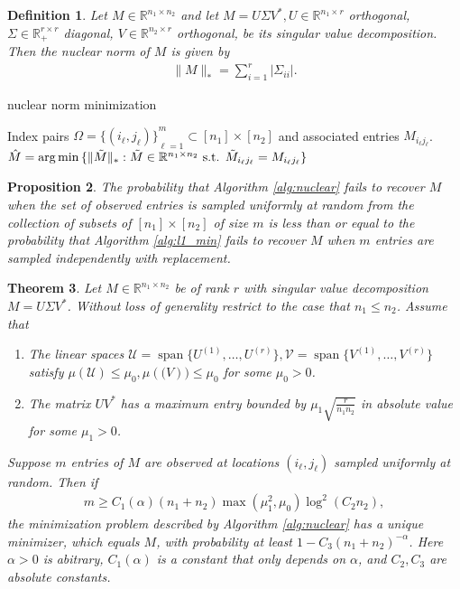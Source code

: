 \documentclass[13pt]{article}
\newtheorem{thm}{Theorem}[section]
\newtheorem{prop}[thm]{Proposition}
\theoremstyle{plain}
\newtheorem{defi}[thm]{Definition}
\newcommand{\R}{\mathbb{R}}
\newcommand{\set}[1]{{\{#1\}}}
\DeclareMathOperator{\argmin}{\arg\min}
\DeclareMathOperator{\mspan}{span}
\newcommand{\til}{\ensuremath{\tilde}}
\begin{document}
\begin{defi}
    Let $M \in \R^{n_1 \times n_2}$ and let $M = U \Sigma V^\ast, U \in \R^{n_1 \times r}$ orthogonal,
    $\Sigma \in \R_+^{r \times r}$ diagonal, $V \in \R^{n_2 \times r}$ orthogonal, be its
    singular value decomposition. Then the \emph{nuclear norm} of $M$ is given by
    \[
        \begin{aligned}
            \|M\|_\ast = \sum_{i=1}^{r} |\Sigma_{ii}|.
        \end{aligned}
    \]
\end{defi}

\begin{algorithm}
\caption{nuclear norm minimization}\label{alg:nuclear}
\begin{algorithmic}
    \Require Index pairs $\Omega = \set{(i_\ell,j_\ell)}_{\ell=1}^m \subset [n_1] \times [n_2]$
        and associated entries $M_{i_\ell j_{\ell}}$.
    \State \Return $\hat{M} = \argmin\set{\|\til{M}\|_\ast : \til{M} \in \R^{n_1 \times n_2} \text{ s.t. } \til{M}_{i_\ell j_\ell} = M_{i_\ell j_\ell}}$
\end{algorithmic}
\end{algorithm}

\begin{prop}
    The probability that Algorithm \ref{alg:nuclear} fails to recover $M$ when
    the set of observed entries is sampled uniformly at random
    from the collection of subsets of $[n_1] \times [n_2]$ of size $m$
    is less than or equal to the probability that Algorithm \ref{alg:l1_min}
    fails to recover $M$ when $m$ entries are sampled independently with replacement.
\end{prop}

\begin{thm}\label{thm:uniq-minimizer}
    Let $M \in \R^{n_1 \times n_2}$ be of rank $r$ with singular value decomposition
    $M = U\Sigma V^\ast$. Without loss of generality restrict to the case that
    $n_1 \le n_2$. Assume that
    \begin{enumerate}[label=(A\arabic*), start=0]
        \item The linear spaces $\mathcal{U} = \mspan\set{U^{(1)}, \ldots, U^{(r)}}, \mathcal{V} = \mspan\set{V^{(1)}, \ldots, V^{(r)}}$
            satisfy $\mu(\mathcal{U}) \le \mu_0, \mu(\mathcal(V)) \le \mu_0$ for some $\mu_0 > 0$.
        \item The matrix $UV^\ast$ has a maximum entry bounded by $\mu_1\sqrt{\frac{r}{n_1n_2}}$ in absolute value
            for some $\mu_1 > 0$.
    \end{enumerate}
    Suppose $m$ entries of $M$ are observed at locations $(i_{\ell}, j_\ell)$ sampled uniformly at random.
    Then if
    \[
        \begin{aligned}
            m \ge C_1(\alpha) (n_1 + n_2) \max(\mu_1^2,\mu_0) \log^2(C_2n_2),
        \end{aligned}
    \]
    the minimization problem described by Algorithm \ref{alg:nuclear} has a unique
    minimizer, which equals $M$, with probability at least $1 - C_3(n_1 + n_2)^{-\alpha}$.
    Here $\alpha > 0$ is abitrary, $C_1(\alpha)$ is a constant that only depends on $\alpha$,
    and $C_2,C_3$ are absolute constants.
\end{thm}
\end{document}

